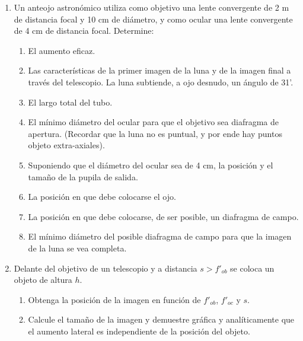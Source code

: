 \documentclass[11pt,spanish,a4paper]{article}
\begin{document}
\begin{enumerate}
\item Un anteojo astronómico utiliza como objetivo una lente convergente
de 2 m de distancia focal y 10 cm de diámetro, y como ocular una lente
convergente de 4 cm de distancia focal. Determine:
\begin{enumerate}
\item El aumento eficaz.
\item Las características de la primer imagen de la luna y de la imagen
final a través del telescopio. La luna subtiende, a ojo desnudo, un
ángulo de 31'.
\item El largo total del tubo.
\item El mínimo diámetro del ocular para que el objetivo sea diafragma de
apertura. (Recordar que la luna no es puntual, y por ende hay puntos
objeto extra-axiales).
\item Suponiendo que el diámetro del ocular sea de 4 cm, la posición y el
tamaño de la pupila de salida.
\item La posición en que debe colocarse el ojo.
\item La posición en que debe colocarse, de ser posible, un diafragma de
campo.
\item El mínimo diámetro del posible diafragma de campo para que la imagen
de la luna se vea completa.
\end{enumerate}


\item Delante del objetivo de un telescopio y a distancia $s>f'_{ob}$ se
coloca un objeto de altura $h$.
\begin{enumerate}
\item Obtenga la posición de la imagen en función de $f'_{ob}$, $f'_{oc}$
y $s$. 
\item Calcule el tamaño de la imagen y demuestre gráfica y analíticamente
que el aumento lateral es independiente de la posición del objeto.
\end{enumerate}



\end{enumerate}
\end{document}
